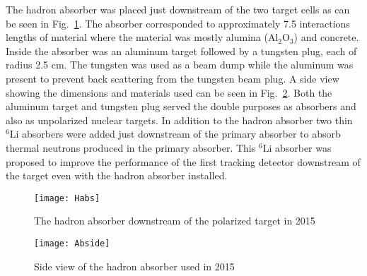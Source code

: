 The hadron absorber was placed just downstream of the two target cells as can be
seen in Fig.~\ref{fig::Habs}.  The absorber corresponded to approximately 7.5
interactions lengths of material where the material was mostly alumina
(Al$_2$O$_3$) and concrete.  Inside the absorber was an aluminum target followed
by a tungsten plug, each of radius 2.5 cm.  The tungsten was used as a beam dump
while the aluminum was present to prevent back scattering from the tungsten beam
plug.  A side view showing the dimensions and materials used can be seen in
Fig.~\ref{fig::Abside}.  Both the aluminum target and tungsten plug served the
double purposes as absorbers and also as unpolarized nuclear targets.  In
addition to the hadron absorber two thin $^6\mathrm{Li}$ absorbers were added
just downstream of the primary absorber to absorb thermal neutrons produced in
the primary absorber.  This $^6\mathrm{Li}$ absorber was proposed to improve the
performance of the first tracking detector downstream of the target even with
the hadron absorber installed. \par

\begin{figure}[h!t]
  \centering
  \texttt{[image: Habs]}
  \caption{The hadron absorber downstream of the polarized target in 2015}
  \label{fig::Habs}
\end{figure}

\begin{figure}[h!t]
  \centering
  \texttt{[image: Abside]}
  \caption{Side view of the hadron absorber used in 2015}
  \label{fig::Abside}
\end{figure}
